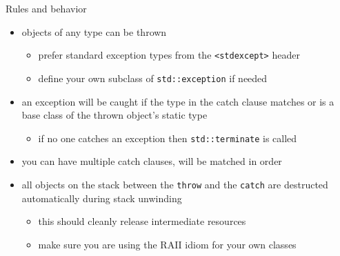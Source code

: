 \begin{frame}[fragile]
  \begin{block}{Rules and behavior}
    \begin{itemize}
      \item objects of any type can be thrown
      \begin{itemize}
        \item prefer standard exception types from the \texttt{<stdexcept>} header
        \item define your own subclass of \texttt{std::exception} if needed
      \end{itemize}
      \item an exception will be caught if the type in the catch clause matches or is a base class of the thrown object's static type
      \begin{itemize}
          \item if no one catches an exception then \texttt{std::terminate} is called
      \end{itemize}
      \item you can have multiple catch clauses, will be matched in order
      \item all objects on the stack between the \texttt{throw} and the \texttt{catch} are destructed automatically during stack unwinding
      \begin{itemize}
        \item this should cleanly release intermediate resources
        \item make sure you are using the RAII idiom for your own classes
      \end{itemize}
    \end{itemize}
  \end{block}
\end{frame}

